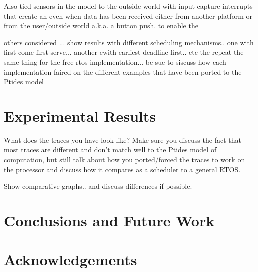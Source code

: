 \documentclass{sig-alternate}
\begin{document}
Also tied sensors in the model to the outside world with input capture interrupts that create an even when data has been received either from another platform or from the user/outside world a.k.a. a button push.
to enable the 


others considered ... show results with different scheduling mechanisms.. one with first come first serve... another ewith earliest deadline first.. etc
the repeat the same thing for the free rtos implementation...
be sue to siscuss how each implementation faired on the different examples that have been ported to the Ptides model

\section{Experimental Results}
What does the traces you have look like? Make sure you discuss the fact that most traces are different and don't match well to the Ptides model of computation, but still talk about how you ported/forced the traces to work on the processor and discuss how it compares as a scheduler to a general RTOS.

Show comparative graphs.. and discuss differences if possible.



\section{Conclusions and Future Work}
\label{scfw}
\section{Acknowledgements}

 


 
\end{document}

